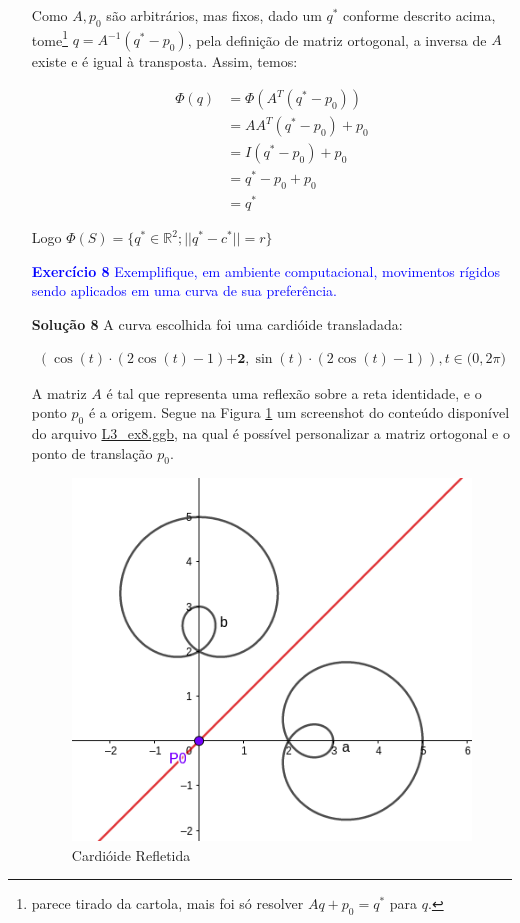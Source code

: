 \documentclass[12pt,letterpaper]{article}
\newcommand{\rr}{\mathbb{R}^2}
\newcommand{\ex}[1]{\textcolor{blue}{\textbf{Exercício #1}}}
\newcommand{\sol}[1]{\textbf{Solução #1}}
\begin{document}
\begin{enumerate}
	Como $A,p_0$ são arbitrários, mas fixos, dado um $q^*$ conforme descrito acima, tome\footnote{parece tirado da cartola, mais foi só resolver $Aq+p_0=q^*$ para $q$.} $q=A^{-1}(q^*-p_0)$, pela definição de matriz ortogonal, a inversa de $A$ existe e é igual à transposta. Assim, temos:
	
	\begin{align*}
		\Phi(q)&=\Phi(A^T(q^*-p_0))\\
		&=AA^T(q^*-p_0)+p_0\\
		&=I(q^*-p_0)+p_0\\
		&=q^*-p_0+p_0\\
		&=q^*
	\end{align*}

	Logo $\Phi(S)=\{q^*\in\rr;||q^*-c^*||=r\}$
	
	
	
	
	\item[\ex{8}]\textcolor{blue}{Exemplifique, em ambiente computacional, movimentos rígidos sendo aplicados em uma curva de sua preferência.}
	
	
	\item[\sol{8}] A curva escolhida foi uma cardióide transladada:
	
	\begin{align*}
		(\cos(t)\cdot(2\cos(t)-1)\boldsymbol{+2},\sin(t)\cdot(2\cos(t)-1)),t\in\mathbb(0,2\pi)
	\end{align*}

	A matriz $A$ é tal que representa uma reflexão sobre a reta identidade, e o ponto $p_0$ é a origem. Segue na Figura \ref{ex8} um screenshot do conteúdo disponível do arquivo \href{https://github.com/reneroliveira/Curves_and_Surfaces/blob/main/ggb_files/L3_ex8.ggb}{L3\_ex8.ggb}, na qual é possível personalizar a matriz ortogonal e o ponto de translação $p_0$.
	\begin{figure}[!htb]
		\centering
		\includegraphics[scale=0.7]{../images/L3_ex8.png}
		\caption{Cardióide Refletida}
		\label{ex8}
	\end{figure}
	\end{enumerate}


	
	\newpage
	
	
	
\end{document}
